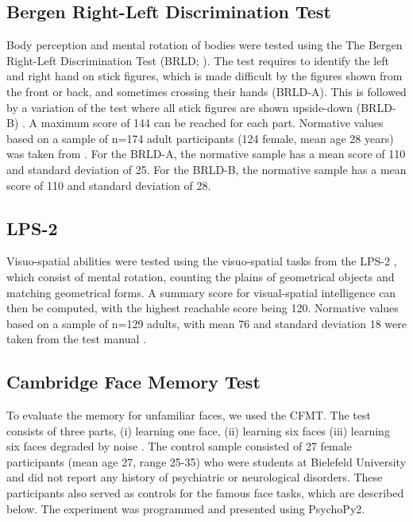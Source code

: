 \documentclass[fleqn,10pt]{SelfArx} %
\begin{document}
\subsection*{Bergen Right-Left Discrimination Test}
Body perception and mental rotation of bodies were tested using the The Bergen Right-Left Discrimination Test (BRLD; \citet{Ofte_2002}). The test requires to identify the left and right hand on stick figures, which is made difficult by the figures shown from the front or back, and sometimes crossing their hands (BRLD-A). This is followed by a variation of the test where all stick figures are shown upside-down (BRLD-B) \citep{Grewe_2014}. A maximum score of 144 can be reached for each part. Normative values based on a sample of n=174 adult participants (124 female, mean age 28 years) was taken from \citet{Grewe_2014}. For the BRLD-A, the normative sample has a mean score of 110 and standard deviation of 25. For the BRLD-B, the normative sample has a mean score of 110 and standard deviation of 28.

\subsection*{LPS-2}
Visuo-spatial abilities were tested using the visuo-spatial tasks from the LPS-2 \citep{Horn}, which consist of mental rotation, counting the plains of geometrical objects and matching geometrical forms. A summary score for visual-spatial intelligence can then be computed, with the highest reachable score being 120. Normative values based on a sample of n=129 adults, with mean 76 and standard deviation 18 were taken from the test manual \citep{Horn}.

\subsection*{Cambridge Face Memory Test}
To evaluate the memory for unfamiliar faces, we used the CFMT. The test consists of three parts, (i) learning one face, (ii) learning six faces (iii) learning six faces degraded by noise \citep{Duchaine_2006cfmt}. The control sample consisted of 27 female participants (mean age 27, range 25-35) who were students at Bielefeld University and did not report any history of psychiatric or neurological disorders. These participants also served as controls for the famous face tasks, which are described below. The experiment was programmed and presented using PsychoPy2.
\end{document}
